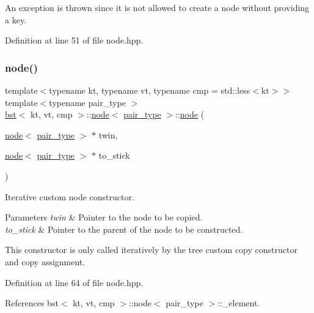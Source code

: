 An exception is thrown since it is not allowed to create a node without providing a key. 

Definition at line 51 of file node.\+hpp.

\mbox{\label{structbst_1_1node_a87b48a3770bbaa16830f8bbb635edd38}} 
\subsubsection{\texorpdfstring{node()}{node()}\hspace{0.1cm}{\footnotesize\ttfamily [2/5]}}
{\footnotesize\ttfamily template$<$typename kt, typename vt, typename cmp = std\+::less$<$kt$>$$>$ \\
template$<$typename pair\+\_\+type $>$ \\
\hyperlink{classbst}{bst}$<$ kt, vt, cmp $>$\+::\hyperlink{structbst_1_1node}{node}$<$ \hyperlink{classbst_a7b11cca2a3b4394915600194f741ab16}{pair\+\_\+type} $>$\+::\hyperlink{structbst_1_1node}{node} (\begin{DoxyParamCaption}\item[{\hyperlink{structbst_1_1node}{node}$<$ \hyperlink{classbst_a7b11cca2a3b4394915600194f741ab16}{pair\+\_\+type} $>$ $\ast$}]{twin,  }\item[{\hyperlink{structbst_1_1node}{node}$<$ \hyperlink{classbst_a7b11cca2a3b4394915600194f741ab16}{pair\+\_\+type} $>$ $\ast$}]{to\+\_\+stick }\end{DoxyParamCaption})\hspace{0.3cm}{\ttfamily [inline]}}



Iterative custom node constructor. 


\begin{DoxyParams}{Parameters}
{\em twin} & Pointer to the node to be copied. \\
\hline
{\em to\+\_\+stick} & Pointer to the parent of the node to be constructed.\\
\hline
\end{DoxyParams}
This constructor is only called iteratively by the tree custom copy constructor and copy assignment. 

Definition at line 64 of file node.\+hpp.



References bst$<$ kt, vt, cmp $>$\+::node$<$ pair\+\_\+type $>$\+::\+\_\+element.

